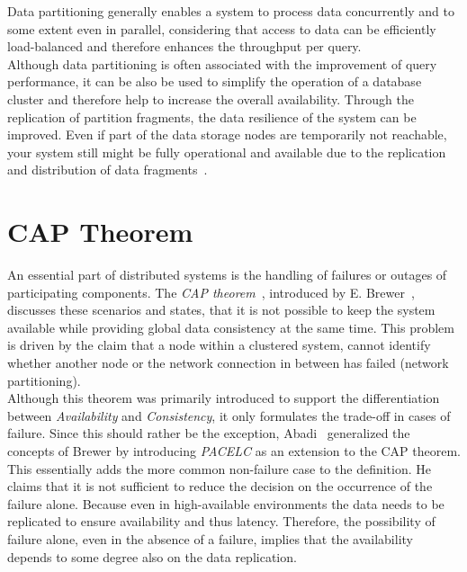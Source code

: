 Data partitioning generally enables a system to process data concurrently and 
to some extent even in parallel, considering that access to data can be 
efficiently load-balanced and therefore enhances the throughput per query.\\

Although data partitioning is often associated with the improvement of query performance,
it can be also be used to simplify the operation of a database cluster and therefore help 
to increase the overall availability.
Through the replication of partition fragments, the data resilience of the system
can be improved. Even if part of the data storage nodes are temporarily not 
reachable, your system still might be fully operational and available due to the 
replication and distribution of data fragments~\cite{dbre2017}.







\section{CAP Theorem}
\label{sec:cap}
An essential part of distributed systems is the handling of failures or outages of participating components. 
The \emph{CAP theorem}~\cite{cap2002}, introduced by E. Brewer~\cite{brewer:2000}, discusses these scenarios and states, that it is not possible 
to keep the system available while providing global data consistency at the same time.
This problem is driven by the claim that a node within a clustered system, cannot identify whether another node or the 
network connection in between has failed (network partitioning).\\
Although this theorem was primarily introduced to support the differentiation between \emph{Availability} and \emph{Consistency}, 
it only formulates the trade-off in cases of failure.
Since this should rather be the exception, Abadi~\cite{abadi2012} generalized the concepts of Brewer by introducing \emph{PACELC} as an extension to the CAP theorem.
This essentially adds the more common non-failure case to the definition.
He claims that it is not sufficient to reduce the decision on the occurrence of the failure alone. 
Because even in high-available environments the data needs to be replicated to ensure availability and thus latency. 
Therefore, the possibility of failure alone, even in the absence of a failure, implies that the availability depends to some degree also on the data replication.


